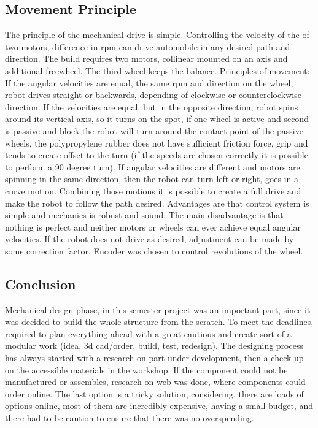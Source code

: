 \documentclass[11pt]{article}
\begin{document}
\subsection*{Movement Principle}
The principle of the mechanical drive is simple. Controlling the velocity of the of two motors, difference in rpm can drive automobile in any desired path and direction. The build requires two motors, collinear mounted on an axis and additional freewheel. The third wheel keeps the balance. Principles of movement: If the angular velocities are equal, the same rpm and direction on the wheel, robot drives straight or backwards, depending of clockwise or counterclockwise direction. If the velocities are equal, but in the opposite direction, robot spins around its vertical axis, so it turns on the spot, if one wheel is active and second is passive and block the robot will turn around the contact point of the passive wheels, the polypropylene rubber does not have sufficient friction force, grip and tends to create offset to the turn (if the speeds are chosen correctly it is possible to perform a 90 degree turn). If angular velocities are different and motors are spinning in the same direction, then the robot can turn left or right, goes in a curve motion. Combining those motions it is possible to create a full drive and make the robot to follow the path desired. Advantages are that control system is simple and mechanics is robust and sound. The main disadvantage is that nothing is perfect and neither motors or wheels can ever achieve equal angular velocities. If the robot does not drive as desired, adjustment can be made by some correction factor. Encoder was chosen to control revolutions of the wheel.

\subsection*{Conclusion}
Mechanical design phase, in this semester project was an important part, since it was decided to build the whole structure from the scratch. To meet the deadlines, required to plan everything ahead with a great cautious and create sort of a modular work (idea, 3d cad/order, build, test, redesign). The designing process has always started with a research on part under development, then a check up on the accessible materials in the workshop. If the component could not be manufactured or assembles, research on web was done, where components could order online. The last option is a tricky solution, considering, there are loads of options online, most of them are incredibly expensive, having a small budget, and there had to be caution to ensure that there was no overspending.
\end{document}
